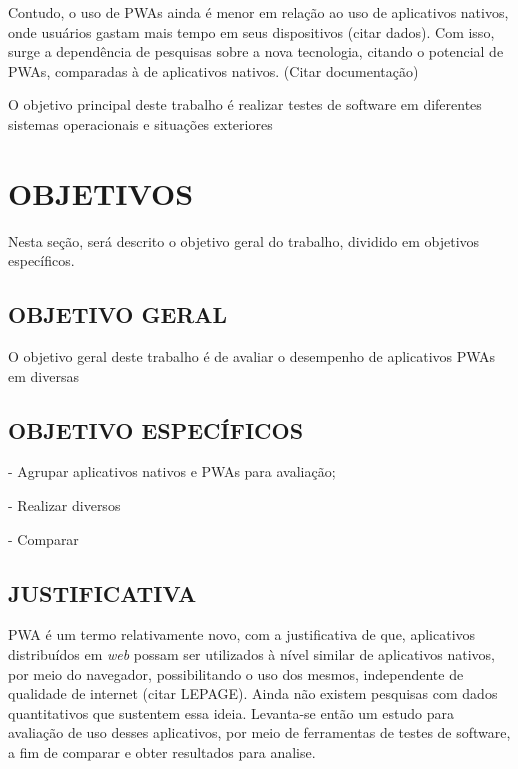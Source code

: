    Contudo, o uso de PWAs ainda é menor em relação ao uso de aplicativos nativos, onde usuários gastam mais tempo em seus dispositivos (citar dados). Com isso, surge a dependência de pesquisas sobre a nova tecnologia, citando o potencial de PWAs, comparadas à de aplicativos nativos. (Citar documentação)
   
   O objetivo principal deste trabalho é realizar testes de software em diferentes sistemas operacionais e situações exteriores %
   
   \section{OBJETIVOS}
   
   Nesta seção, será descrito o objetivo geral do trabalho, dividido em objetivos específicos.
   
   \subsection{OBJETIVO GERAL}
   
   O objetivo geral deste trabalho é de avaliar o desempenho de aplicativos PWAs em diversas %
   
   \subsection{OBJETIVO ESPECÍFICOS}
   
   - Agrupar aplicativos nativos e PWAs para avaliação; %
   
   - Realizar diversos %
   
   - Comparar %
   
   
   \subsection{JUSTIFICATIVA}
   
   PWA é um termo relativamente novo, com a justificativa de que, aplicativos distribuídos em \textit{web} possam ser utilizados à nível similar de aplicativos nativos, por meio do navegador, possibilitando o uso dos mesmos, independente de qualidade de internet (citar LEPAGE). Ainda não existem pesquisas com dados quantitativos que sustentem essa ideia. Levanta-se então um estudo para avaliação de uso desses aplicativos, por meio de ferramentas de testes de software, a fim de comparar e obter resultados para analise. %